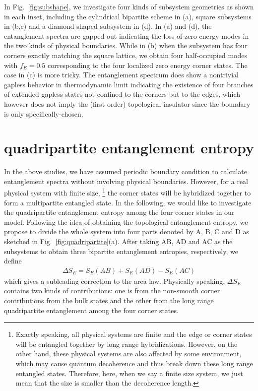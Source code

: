 \documentclass[doublecol]{epl2} %
\begin{document}
In Fig.~\ref{fig:subshape}, we investigate four kinds of subsystem geometries as shown in each inset, including the cylindrical bipartite scheme in (a), square subsystems in (b,c) and a diamond shaped subsystem in (d). In (a) and (d), the entanglement spectra are gapped out indicating the loss of zero energy modes in the two kinds of physical boundaries. While in (b) when the subsystem has four corners exactly matching the square lattice, we obtain four half-occupied modes with $f_{E}=0.5$ corresponding to the four localized zero energy corner states. The case in (c) is more tricky. The entanglement spectrum does show a nontrivial gapless behavior in thermodynamic limit indicating the existence of four branches of extended gapless states not confined to the corners but to the edges, which however does not imply the (first order) topological insulator since the boundary is only specifically-chosen. 

\section{quadripartite entanglement entropy}

In the above studies, we have assumed periodic boundary condition to calculate entanglement spectra without involving physical boundaries. However, for a real physical system with finite size, \footnote{Exactly speaking, all physical systems are finite and the edge or corner states will be entangled together by long range hybridizations. However, on the other hand, these physical systems are also affected by some environment, which may cause quantum decoherence and thus break down these long range entangled states. Therefore, here, when we say a finite size system, we just mean that the size is smaller than the decoherence length.} the corner states will be hybridized together to form a multipartite entangled state. In the following, we would like to investigate the quadripartite entanglement entropy among the four corner states in our model. Following the idea of obtaining the topological entanglement entropy, \cite{Kitaev_PRL_2006, Levin_PRL_2006} we propose to divide the whole system into four parts denoted by A, B, C and D as sketched in Fig.~\ref{fig:quadripartite}(a). After taking AB, AD and AC as the subsystems to obtain three bipartite entanglement entropies, respectively, we define
\begin{eqnarray}
\Delta S_E=S_E(AB)+S_E(AD)-S_E(AC)
\end{eqnarray}
which gives a subleading correction to the area law. Physically speaking, $\Delta S_E$ contains two kinds of contributions: one is from the non-smooth corner contributions from the bulk states and the other from the long range quadripartite entanglement among the four corner states.
\end{document}
